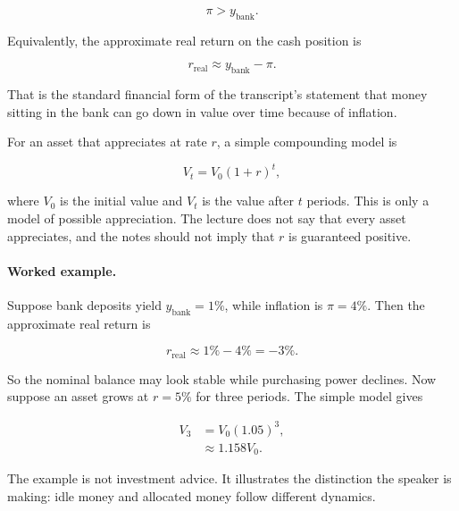 \begin{equation}
\pi>y_{\text{bank}}.
\end{equation}

Equivalently, the approximate real return on the cash position is

\begin{equation}
r_{\text{real}}\approx y_{\text{bank}}-\pi.
\end{equation}

That is the standard financial form of the transcript's statement that money sitting in the bank can go down in value over time because of inflation.

For an asset that appreciates at rate \(r\), a simple compounding model is

\begin{equation}
V_t=V_0(1+r)^t,
\end{equation}

where \(V_0\) is the initial value and \(V_t\) is the value after \(t\) periods. This is only a model of possible appreciation. The lecture does not say that every asset appreciates, and the notes should not imply that \(r\) is guaranteed positive.

\paragraph{Worked example.}
Suppose bank deposits yield \(y_{\text{bank}}=1\%\), while inflation is \(\pi=4\%\). Then the approximate real return is

\begin{equation}
r_{\text{real}}\approx 1\%-4\%=-3\%.
\end{equation}

So the nominal balance may look stable while purchasing power declines. Now suppose an asset grows at \(r=5\%\) for three periods. The simple model gives

\begin{align}
V_3 &= V_0(1.05)^3,\\
    &\approx 1.158V_0.
\end{align}

The example is not investment advice. It illustrates the distinction the speaker is making: idle money and allocated money follow different dynamics.

